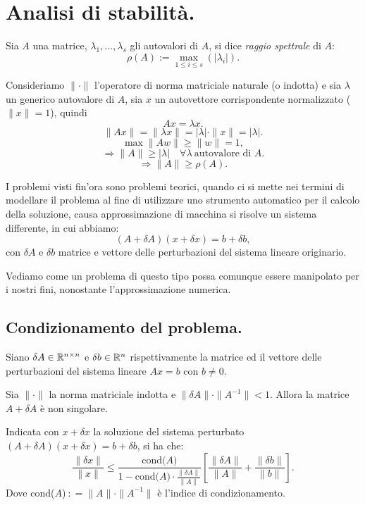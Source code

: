 

\chapter{Analisi di stabilità.}

\begin{defi}
Sia $A$ una matrice, $\lambda_1, \ldots, \lambda_s$ gli autovalori di
$A$, si dice \emph{raggio spettrale} di $A$:
\[
\rho(A) := \max_{1\leq i\leq s}(|\lambda_i|).
\]
\end{defi}

Consideriamo $\|\cdot\|$ l'operatore di norma matriciale naturale (o indotta)
e sia $\lambda$ un generico autovalore di $A$, sia $x$ un autovettore
corrispondente normalizzato ($\|x\| = 1$), quindi
\[Ax = \lambda x.\]
\[\|Ax\| = \|\lambda x\| = |\lambda|\cdot \|x\| = |\lambda|.\]
\[\max \|Aw\| \geq \|w\| = 1,\]
\[\Rightarrow \|A\| \geq |\lambda| \quad \forall \lambda \ \textrm{autovalore
di } A.\]
\[\Rightarrow \|A\| \geq \rho(A).\]

\begin{osse}
I problemi visti fin'ora sono problemi teorici, quando ci si mette nei termini
di modellare il problema al fine di utilizzare uno strumento automatico per
il calcolo della soluzione, causa approssimazione di macchina si risolve un
sistema differente, in cui abbiamo:
\[(A+\delta A)(x+\delta x) = b + \delta b,\]
con $\delta A $ e $\delta b $ matrice e vettore delle perturbazioni del sistema
lineare originario.
\end{osse}

Vediamo come un problema di questo tipo possa comunque essere manipolato per i
nostri fini, nonostante l'approssimazione numerica.

\section{Condizionamento del problema.}
\begin{teo}\label{teo6.2}
Siano $\delta A \in \mathbb{R}^{n \times n}$ e $\delta b \in \mathbb{R}^{n}$ rispettivamente
la matrice ed il vettore delle perturbazioni del sistema lineare $Ax = b$ con
$b \neq 0$.

Sia $\|\cdot\|$ la norma matriciale indotta e $\|\delta A\|
\cdot \|A^{-1}\| < 1$. Allora la matrice $A + \delta A$ è non singolare.

Indicata con $x + \delta x$ la soluzione del sistema perturbato $(A+\delta A)
(x+\delta x) = b + \delta b$, si ha che:
\[
\frac{\|\delta x\|}{\|x\|} \leq \frac{\textrm{cond(}A\textrm{)}}
{1 -\textrm{cond(}A\textrm{)}
\cdot  \frac{\|\delta A\|}{\|A\|}}
\left[\frac{\|\delta A\|}{\|A\|} + \frac{\|\delta b\|}{\|b\|}\right].
\]
Dove cond($A$)$\ : = \|A\|\cdot\|A^{-1}\|$ è l'indice di condizionamento.
\end{teo}

